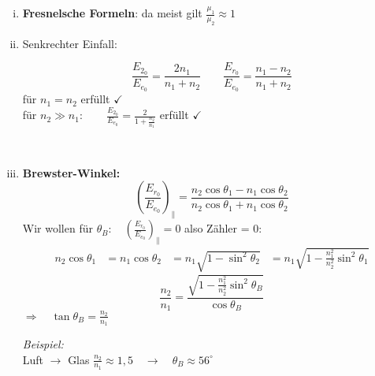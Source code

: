 \begin{enumerate}[i)]
	\item \textbf{Fresnelsche Formeln}: da meist gilt $ \frac{\mu_1}{\mu_2} \approx 1 $
	\item Senkrechter Einfall:\\
	\begin{minipage}{.6\linewidth}
		\begin{equation*}
		\frac{E_{2_0}}{E_{e_0}} = \frac{2n_1}{n_1 + n_2} \qquad \frac{E_{r_0}}{E_{e_0}} = \frac{n_1 - n_2}{n_1 + n_2}
		\end{equation*}
		für $ n_1 = n_2 $ erfüllt $ \checkmark $\\[5pt]
		für $ n_2 \gg n_1 : \qquad \frac{E_{2_0}}{E_{e_0}} = \frac{2}{1 + \frac{n_2}{n_1}} $ erfüllt $ \checkmark $
	\end{minipage}%
	\begin{minipage}{.4\linewidth}
		\flushright
	\end{minipage}%
	\\
	\item \textbf{Brewster-Winkel:}
	\begin{equation*}
	\left(\frac{E_{r_0}}{E_{e_0}}\right)_{\parallel} = \frac{n_2 \cos \theta_1 - n_1 \cos \theta_2}{n_2 \cos \theta_1 + n_1 \cos \theta_2}
	\end{equation*}
	Wir wollen für $ \theta_B:  \quad \left(\frac{E_{r_0}}{E_{e_0}}\right)_\parallel = 0 $ also Zähler = 0:
	\begin{align*}
	n_2 \cos \theta_1 &= n_1 \cos \theta_2
	&= n_1 \sqrt{1 - \sin^2 \theta_2}
	&= n_1 \sqrt{1 - \frac{n_1^2}{n_2^2} \sin^2 \theta_1}
	\end{align*}
	\begin{equation*}
	\frac{n_2}{n_1} = \frac{\sqrt{1 - \frac{n_1^2}{n_2^2} \sin^2 \theta_B}}{\cos \theta_B}
	\end{equation*}
	$ \Rightarrow \quad \tan \theta_B = \frac{n_2}{n_1} $\\[5pt]
	\begin{minipage}{.5\linewidth}
		\emph{Beispiel:}\\
		Luft $ \rightarrow $ Glas $ \frac{n_2}{n_1} \approx 1{,}5 \quad \rightarrow \quad \theta_B \approx 56^\circ $\\[5pt]

\end{minipage}
\end{enumerate}
